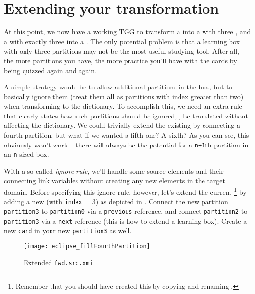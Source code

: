 \section{Extending your transformation}
\genHeader

At this point, we now have a working TGG to transform a  into a  with three , and a  with exactly three  into a . 
The only potential problem is that a learning box with only three partitions may not be the most useful studying tool. 
After all, the more partitions you have, the more practice you'll have with the cards by being quizzed again and again.

A simple strategy would be to allow additional partitions in the box, but to basically ignore them (treat them all as partitions with index greater than two) when transforming to the dictionary. 
To accomplish this, we need an extra rule that clearly states how such partitions should be ignored, \idest, be translated without affecting the dictionary. 
We could trivially extend the existing  by connecting a fourth partition, but what if we wanted a fifth one? A sixth? As you can see, this obviously won't work -- there will always be the potential for a \texttt{n+1}th partition in an \texttt{n}-sized box. 

With a so-called \emph{ignore rule}, we'll handle some source elements and their connecting link variables without creating any new elements in the target domain.
%
Before specifying this ignore rule, however, let's extend the current \footnote{Remember that you should have created this by copying and renaming .} by adding a new  (with \texttt{index} = 3) as depicted in .
Connect the new partition \texttt{partition3}  to \texttt{partition0} via a \texttt{previous} reference, and connect \texttt{partition2} to \texttt{partition3} via a \texttt{next} reference (this is how to extend a learning box).
Create a new \texttt{card} in your new \texttt{partition3} as well.

\begin{figure}[htbp]
\begin{center}
  \texttt{[image: eclipse\_fillFourthPartition]}
  \caption{Extended \texttt{fwd.src.xmi}}
  \label{fig:ea_extended_fwd_src_xmi}
\end{center}
\end{figure}


